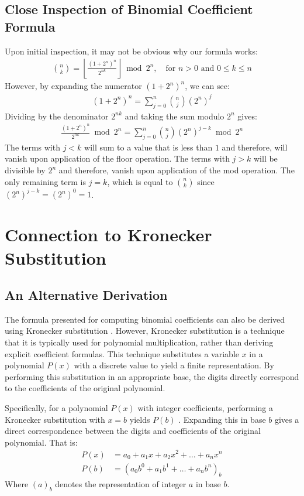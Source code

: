 \documentclass{article}
\theoremstyle{plain}
\theoremstyle{definition}
\begin{document}
\subsection{Close Inspection of Binomial Coefficient Formula}
Upon initial inspection, it may not be obvious why our formula works:
\begin{align*}
    \binom{n}{k} = \left\lfloor\frac{(1 + 2^{n})^{n}}{2^{n k}}\right\rfloor \bmod{2^{n}}, \quad \text{for } n > 0 \text{ and } 0 \leq k \leq n
\end{align*}
However, by expanding the numerator $(1 + 2^{n})^{n}$, we can see:
\begin{align}
    (1 + 2^{n})^{n} = \sum_{j=0}^{n} \binom{n}{j} (2^n)^{j}
\end{align}
Dividing by the denominator $2^{n k}$ and taking the sum modulo $2^n$ gives:
\begin{align}
    \frac{(1 + 2^{n})^{n}}{2^{n k}} \bmod{2^n} = \sum_{j=0}^{n} \binom{n}{j} (2^n)^{j-k} \bmod{2^n}
\end{align}
The terms with $j < k$ will sum to a value that is less than $1$ and therefore, will vanish upon application of the floor operation. The terms with $j > k$ will be divisible by $2^n$ and therefore, vanish upon application of the mod operation. The only remaining term is $j = k$, which is equal to $\binom{n}{k}$ since $(2^n)^{j-k} = (2^n)^0 = 1$.

\section{Connection to Kronecker Substitution}
\label{sec:kronecker}

\subsection{An Alternative Derivation}
The formula presented for computing binomial coefficients can also be derived using Kronecker substitution \cite{grimaldi2004discrete}. However, Kronecker substitution is a technique that it is typically used for polynomial multiplication, rather than deriving explicit coefficient formulas. This technique substitutes a variable $x$ in a polynomial $P(x)$ with a discrete value to yield a finite representation. By performing this substitution in an appropriate base, the digits directly correspond to the coefficients of the original polynomial.

Specifically, for a polynomial $P(x)$ with integer coefficients, performing a Kronecker substitution with $x = b$ yields $P(b)$ \cite{grimaldi2004discrete}. Expanding this in base $b$ gives a direct correspondence between the digits and coefficients of the original polynomial. That is:
\begin{align}
    P(x) &= a_0 + a_1 x + a_2 x^2 + \ldots + a_n x^n \\
    P(b) &= (a_0 b^0 + a_1 b^1 + \ldots + a_n b^n)_b
\end{align}
Where $(a)_b$ denotes the representation of integer $a$ in base $b$.
\end{document}
